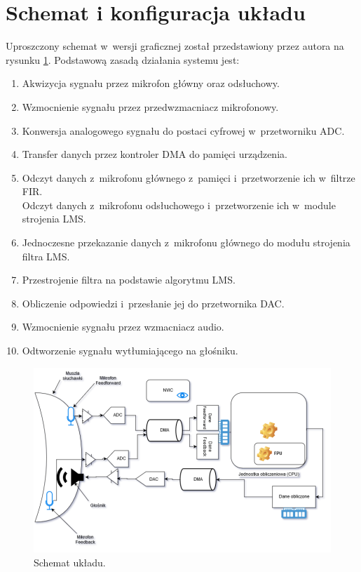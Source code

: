 \section{Schemat i konfiguracja układu}
\label{sec:config}
Uproszczony schemat w~wersji graficznej został przedstawiony przez autora na rysunku \ref{fig:schemat1}. Podstawową zasadą działania systemu jest:
\begin{enumerate}
	\item Akwizycja sygnału przez mikrofon główny oraz odsłuchowy.
	\item Wzmocnienie sygnału przez przedwzmacniacz mikrofonowy.
	\item Konwersja analogowego sygnału do postaci cyfrowej w~przetworniku ADC.
	\item Transfer danych przez kontroler DMA do pamięci urządzenia.
	\item Odczyt danych z~mikrofonu głównego z~pamięci i~przetworzenie ich w~filtrze FIR.\\
	Odczyt danych z~mikrofonu odsłuchowego i~przetworzenie ich w~module strojenia LMS.
	\item Jednoczesne przekazanie danych z~mikrofonu głównego do modułu strojenia filtra LMS.
	\item Przestrojenie filtra na podstawie algorytmu LMS.
	\item Obliczenie odpowiedzi i~przesłanie jej do przetwornika DAC.
	\item Wzmocnienie sygnału przez wzmacniacz audio.
	\item Odtworzenie sygnału wytłumiającego na głośniku.
\end{enumerate}
\begin{figure}
	\includegraphics[width=\linewidth]{../Assets/schemat_ukladu.png}	
	\caption{Schemat układu.}
	\label{fig:schemat1}
\end{figure}
